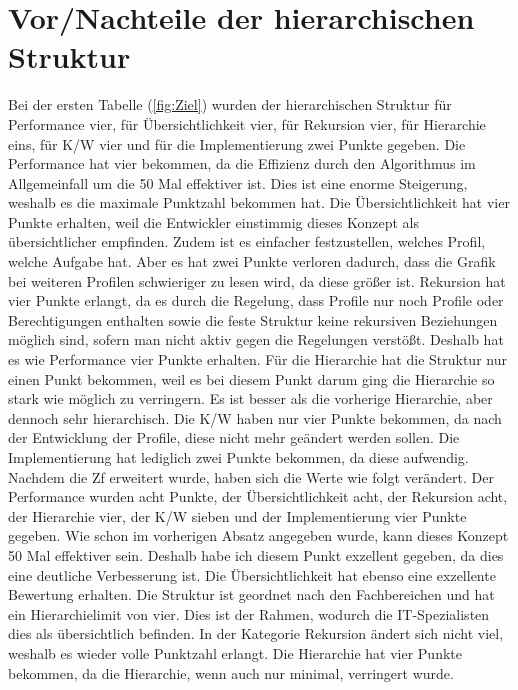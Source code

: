 \section{Vor/Nachteile der hierarchischen Struktur}
\label{sec:chapter05:Hierarchische}
Bei der ersten Tabelle (\ref{fig:Ziel}) wurden der hierarchischen Struktur für Performance vier, für Übersichtlichkeit vier, für Rekursion vier, für Hierarchie eins, für \ac{K/W} vier und für die Implementierung zwei Punkte gegeben.
Die Performance hat vier bekommen, da die Effizienz durch den Algorithmus im Allgemeinfall um die 50 Mal effektiver ist.
Dies ist eine enorme Steigerung, weshalb es die maximale Punktzahl bekommen hat.
Die Übersichtlichkeit hat vier Punkte erhalten, weil die Entwickler einstimmig dieses Konzept als übersichtlicher empfinden.
Zudem ist es einfacher festzustellen, welches Profil, welche Aufgabe hat.
Aber es hat zwei Punkte verloren dadurch, dass die Grafik bei weiteren Profilen schwieriger zu lesen wird, da diese größer ist.
Rekursion hat vier Punkte erlangt, da es durch die Regelung, dass Profile nur noch Profile oder Berechtigungen enthalten sowie die feste Struktur keine rekursiven Beziehungen möglich sind, sofern man nicht aktiv gegen die Regelungen verstößt.
Deshalb hat es wie Performance vier Punkte erhalten.
Für die Hierarchie hat die Struktur nur einen Punkt bekommen, weil es bei diesem Punkt darum ging die Hierarchie so stark wie möglich zu verringern.
Es ist besser als die vorherige Hierarchie, aber dennoch sehr hierarchisch.
Die \ac{K/W} haben nur vier Punkte bekommen, da nach der Entwicklung der Profile, diese nicht mehr geändert werden sollen.
Die Implementierung hat lediglich zwei Punkte bekommen, da diese aufwendig.
\newline
\newline
Nachdem die \ac{Zf} erweitert wurde, haben sich die Werte wie folgt verändert.
Der Performance wurden acht Punkte, der Übersichtlichkeit acht, der Rekursion acht, der Hierarchie vier, der \ac{K/W} sieben und der Implementierung vier Punkte gegeben.
Wie schon im vorherigen Absatz angegeben wurde, kann dieses Konzept 50 Mal effektiver sein.
Deshalb habe ich diesem Punkt exzellent gegeben, da dies eine deutliche Verbesserung ist.
Die Übersichtlichkeit hat ebenso eine exzellente Bewertung erhalten.
Die Struktur ist geordnet nach den Fachbereichen und hat ein Hierarchielimit von vier.
Dies ist der Rahmen, wodurch die IT-Spezialisten dies als übersichtlich befinden.
In der Kategorie Rekursion ändert sich nicht viel, weshalb es wieder volle Punktzahl erlangt.
Die Hierarchie hat vier Punkte bekommen, da die Hierarchie, wenn auch nur minimal, verringert wurde.
